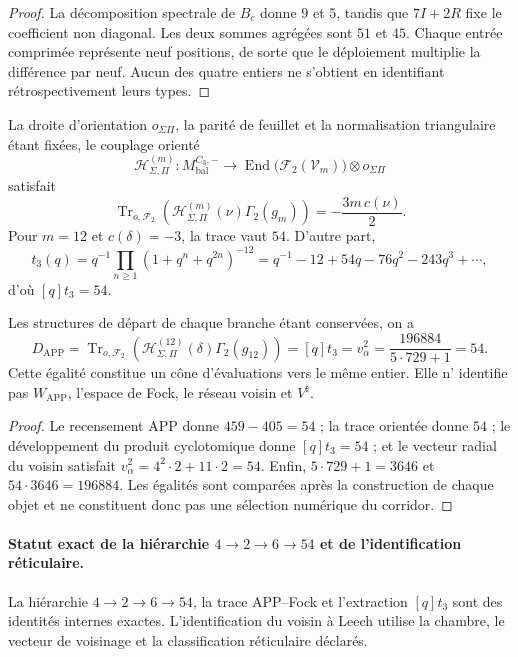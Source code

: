 \begin{proof}
La décomposition spectrale de \(B_c\) donne \(9\) et \(5\), tandis que
\(7I+2R\) fixe le coefficient non diagonal. Les deux sommes agrégées sont \(51\)
et \(45\). Chaque entrée comprimée représente neuf positions, de sorte que le
déploiement multiplie la différence par neuf. Aucun des quatre entiers
ne s'obtient en identifiant rétrospectivement leurs types.
\end{proof}

La droite d'orientation \(o_{\Sigma\Pi}\), la parité de feuillet et la
normalisation triangulaire étant fixées, le couplage orienté
\[
 \mathcal H_{\Sigma,\Pi}^{(m)}:
 M_{\mathrm{bal}}^{C_3,-}
 \longrightarrow
 \operatorname{End}\!\bigl(\mathcal F_2(\mathcal V_m)\bigr)
 \otimes o_{\Sigma\Pi}
\]
satisfait
\[
 \operatorname{Tr}_{o,\mathcal F_2}
 \left(\mathcal H_{\Sigma,\Pi}^{(m)}(\nu)\Gamma_2(g_m)\right)
 =-\frac{3m\,c(\nu)}2.
\]
Pour \(m=12\) et \(c(\delta)=-3\), la trace vaut \(54\). D'autre part,
\[
 t_3(q)=q^{-1}\prod_{n\ge1}(1+q^n+q^{2n})^{-12}
       =q^{-1}-12+54q-76q^2-243q^3+\cdots,
\]
d'où \([q]t_3=54\).

\begin{theorem}
\label{thm:cierre-vtm-indice-comun-54}
Les structures de départ de chaque branche étant conservées, on a
\[
 \boxed{
 D_{\mathrm{APP}}
 =\operatorname{Tr}_{o,\mathcal F_2}
   \left(\mathcal H_{\Sigma,\Pi}^{(12)}(\delta)\Gamma_2(g_{12})\right)
 =[q]t_3
 =v_\alpha^2
 =\frac{196884}{5\cdot729+1}
 =54.}
\]
Cette égalité constitue un cône d'évaluations vers le même entier. Elle n'
identifie pas \(W_{\mathrm{APP}}\), l'espace de Fock, le réseau voisin et
\(V^\natural\).
\end{theorem}

\begin{proof}
Le recensement APP donne \(459-405=54\) ; la trace orientée donne \(54\) ; le développement
du produit cyclotomique donne \([q]t_3=54\) ; et le vecteur radial du voisin
satisfait \(v_\alpha^2=4^2\cdot2+11\cdot2=54\). Enfin,
\(5\cdot729+1=3646\) et \(54\cdot3646=196884\). Les égalités sont comparées
après la construction de chaque objet et ne constituent donc pas une sélection numérique du
corridor.
\end{proof}

\paragraph{Statut exact de la hiérarchie \(4\to2\to6\to54\) et de l'identification réticulaire.}
La hiérarchie \(4\to2\to6\to54\), la trace APP--Fock et l'extraction
\([q]t_3\) sont des identités internes exactes. L'identification du voisin à
Leech utilise la chambre, le vecteur de voisinage et la classification réticulaire
déclarés.
%
